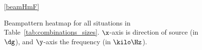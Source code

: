 \begin{figure}[!b]
\ref*{beamHmF}
\caption{Beampattern heatmap for all situations in Table~\ref{tab:combinations_sizes}. ${\x}$-axis is direction of source (in $\dg$), and ${\y}$-axis the frequency (in $\kilo\Hz$).}
\label{fig:beam_heatmap}
\end{figure}